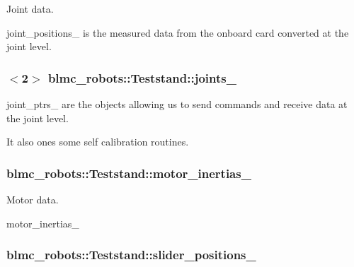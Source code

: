 Joint data. 

joint\+\_\+positions\+\_\+ is the measured data from the onboard card converted at the joint level. 
\subsubsection[{\texorpdfstring{joints\+\_\+}{joints_}}]{$<$2$>$ blmc\+\_\+robots\+::\+Teststand\+::joints\+\_\+\hspace{0.3cm}{\ttfamily [private]}}\hypertarget{classblmc__robots_1_1Teststand_a2c14882d88deb56edde5240a8d841f2a}{}\label{classblmc__robots_1_1Teststand_a2c14882d88deb56edde5240a8d841f2a}


joint\+\_\+ptrs\+\_\+ are the objects allowing us to send commands and receive data at the joint level. 

It also ones some self calibration routines. 
\subsubsection[{\texorpdfstring{motor\+\_\+inertias\+\_\+}{motor_inertias_}}]{ blmc\+\_\+robots\+::\+Teststand\+::motor\+\_\+inertias\+\_\+\hspace{0.3cm}{\ttfamily [private]}}\hypertarget{classblmc__robots_1_1Teststand_afe8801388760cd85771a99e3a89c9f69}{}\label{classblmc__robots_1_1Teststand_afe8801388760cd85771a99e3a89c9f69}


Motor data. 

motor\+\_\+inertias\+\_\+ 
\subsubsection[{\texorpdfstring{slider\+\_\+positions\+\_\+}{slider_positions_}}]{ blmc\+\_\+robots\+::\+Teststand\+::slider\+\_\+positions\+\_\+\hspace{0.3cm}{\ttfamily [private]}}\hypertarget{classblmc__robots_1_1Teststand_ad0ce099eef5b57553d36927e3f7f1203}{}\label{classblmc__robots_1_1Teststand_ad0ce099eef5b57553d36927e3f7f1203}


